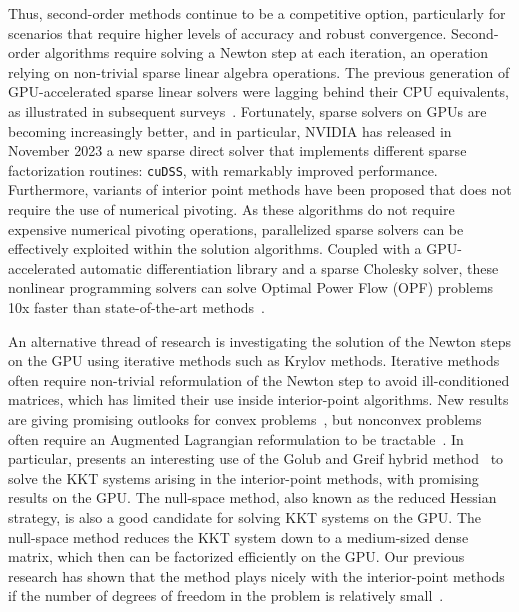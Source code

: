 Thus, second-order methods continue to be a competitive option, particularly
for scenarios that require higher levels of accuracy and robust convergence.
Second-order algorithms require solving a Newton step at each
iteration, an operation relying on non-trivial sparse linear algebra operations.
The previous generation of GPU-accelerated sparse linear
solvers were lagging behind their CPU equivalents, as illustrated in
subsequent surveys~\cite{tasseff2019exploring,swirydowicz2021linear}.
Fortunately, sparse solvers on GPUs are becoming increasingly better, and in particular, NVIDIA has released in November 2023
a new sparse direct solver that implements different sparse factorization routines: {\tt cuDSS}, with remarkably improved performance.
Furthermore, variants of interior point methods have been proposed
that does not require the use of numerical pivoting.
As these algorithms do not require expensive numerical pivoting
operations, parallelized sparse solvers can be effectively exploited
within the solution algorithms.
Coupled with a GPU-accelerated automatic differentiation library and a
sparse Cholesky solver, these nonlinear programming solvers can solve
Optimal Power Flow (OPF) problems 10x faster than state-of-the-art
methods~\cite{shin2023accelerating}.

An alternative thread of research is investigating the solution of the Newton steps
on the GPU using iterative methods such as Krylov methods.
Iterative methods often require non-trivial reformulation of the Newton step to avoid
ill-conditioned matrices, which has limited their use inside interior-point
algorithms. New results are giving promising outlooks for convex problems~\cite{ghannad2022linear},
but nonconvex problems often require an Augmented Lagrangian reformulation
to be tractable~\cite{cao2016augmented,regev2023hykkt}. In particular,
\cite{regev2023hykkt} presents an interesting use of the Golub and Greif
hybrid method~\cite{golub2003solving} to solve the KKT systems arising in
the interior-point methods, with promising results on the GPU.
The null-space method, also known as the reduced Hessian strategy,
is also a good candidate for solving KKT systems on the GPU.
The null-space method reduces the KKT system down to
a medium-sized dense matrix, which then can be factorized efficiently on the GPU.
Our previous research has shown that the method plays nicely with the interior-point
methods if the number of degrees of freedom in the problem is relatively small~\cite{pacaud2022condensed}.

